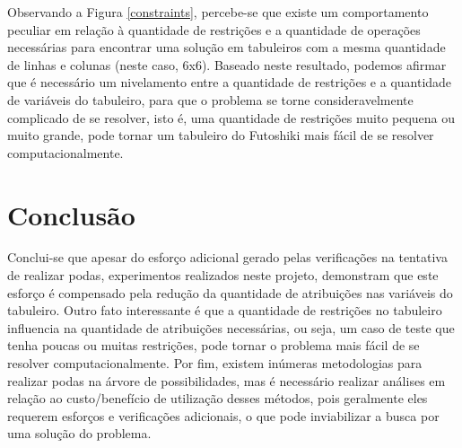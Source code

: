 \documentclass[9pt,technote,compsoc]{IEEEtran}
\begin{document}
Observando a Figura \ref{constraints}, percebe-se que existe um comportamento peculiar em relação à quantidade de restrições e a quantidade de operações necessárias para encontrar uma solução em tabuleiros com a mesma quantidade de linhas e colunas (neste caso, 6x6). Baseado neste resultado, podemos afirmar que é necessário um nivelamento entre a quantidade de restrições e a quantidade de variáveis do tabuleiro, para que o problema se torne consideravelmente complicado de se resolver, isto é, uma quantidade de restrições muito pequena ou muito grande, pode tornar um tabuleiro do Futoshiki mais fácil de se resolver computacionalmente.

\section{Conclusão}\label{conclusion}

Conclui-se que apesar do esforço adicional gerado pelas verificações na tentativa de realizar podas, experimentos realizados neste projeto, demonstram que este esforço é compensado pela redução da quantidade de atribuições nas variáveis do tabuleiro. Outro fato interessante é que a quantidade de restrições no tabuleiro influencia na quantidade de atribuições necessárias, ou seja, um caso de teste que tenha poucas ou muitas restrições, pode tornar o problema mais fácil de se resolver computacionalmente. Por fim, existem inúmeras metodologias para realizar podas na árvore de possibilidades, mas é necessário realizar análises em relação ao custo/benefício de utilização desses métodos, pois geralmente eles requerem esforços e verificações adicionais, o que pode inviabilizar a busca por uma solução do problema.
\end{document}
